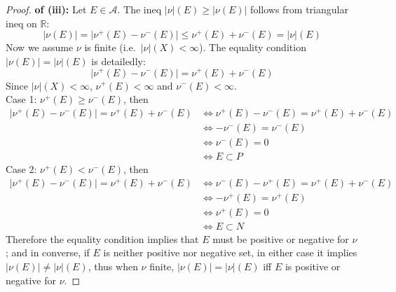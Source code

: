 \documentclass[lang=cn,11pt]{elegantbook}
\begin{document}
\begin{proof}
    \textbf{of (iii):}
    Let $E \in \mathcal{A}$.
The ineq \(|\nu|(E)\geq |\nu(E)|\) follows from triangular ineq on $\mathbb{R}$:
\[
|\nu(E)| = 
\bigl|\nu^+(E) - \nu^-(E)\bigr| \leq 
\nu^+(E) + \nu^-(E) = 
|\nu|(E)
\]
Now we assume \(\nu\) is finite (i.e.\ \(\lvert \nu\rvert(X) < \infty\)). The equality condition \(|\nu(E)| =  |\nu| (E)\) is detailedly:
\[
\bigl|\nu^+(E) - \nu^-(E)\bigr| = 
\nu^+(E) + \nu^-(E)
\]
Since \(\lvert \nu\rvert(X) < \infty\), $\nu^+(E) <\infty$ and $\nu^-(E) <\infty $.\\
Case 1: $\nu^+(E) \geq \nu^-(E)$, then \begin{align*}
    \bigl|\nu^+(E) - \nu^-(E)\bigr| = 
\nu^+(E) + \nu^-(E)& \iff \nu^+(E) - \nu^-(E) = 
\nu^+(E) + \nu^-(E) \\
&\iff -\nu^-(E) = \nu^-(E) \\
&\iff \nu^-(E) = 0 \\
& \iff E \subset P 
\end{align*}
Case 2: $\nu^+(E) < \nu^-(E)$, then  \begin{align*}
    \bigl|\nu^+(E) - \nu^-(E)\bigr| = 
\nu^+(E) + \nu^-(E)& \iff \nu^-(E)  - \nu^+(E) = 
\nu^+(E) + \nu^-(E) \\
&\iff -\nu^+(E) = \nu^+(E) \\
&\iff \nu^+(E) = 0 \\
& \iff E \subset N
\end{align*}
Therefore the equality condition implies that $E$ must be positive or negative for $\nu$; and in converse, if $E$ is neither positive nor negative set, in either case it implies \(|\nu(E)| \not=  |\nu| (E)\), thus when $\nu$ finite, \(|\nu(E)| =  |\nu| (E)\) iff $E$ is positive or negative for $\nu$.
\end{proof}
\end{document}
